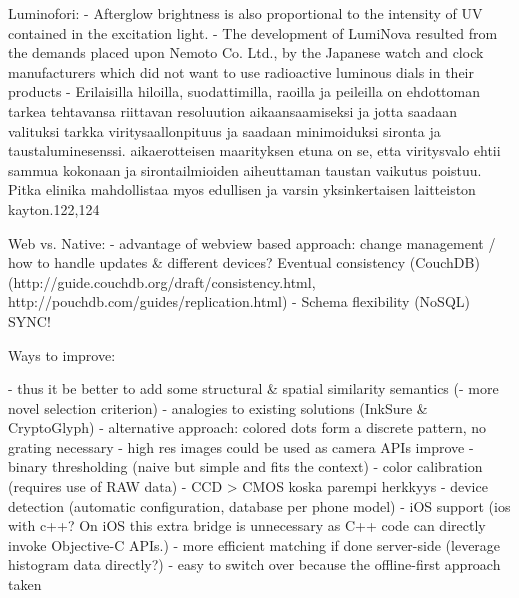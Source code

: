 \documentclass[thesis.tex]{subfiles}
\begin{document}
Luminofori:
- Afterglow brightness is also proportional to the intensity of UV contained in the excitation light.
- The development of LumiNova resulted from the demands placed upon Nemoto  Co. Ltd.,  by the Japanese watch and clock manufacturers which did not want to use radioactive luminous dials in their products
- Erilaisilla hiloilla, suodattimilla, raoilla ja peileilla on ehdottoman tarkea tehtavansa riittavan resoluution aikaansaamiseksi ja jotta saadaan valituksi tarkka viritysaallonpituus ja saadaan minimoiduksi sironta ja taustaluminesenssi. aikaerotteisen maarityksen etuna on se, etta viritysvalo ehtii sammua kokonaan ja sirontailmioiden aiheuttaman taustan vaikutus poistuu. Pitka elinika mahdollistaa myos edullisen ja varsin yksinkertaisen laitteiston kayton.122,124

Web vs. Native:
- advantage of webview based approach: change management / how to handle updates \& different devices?
Eventual consistency (CouchDB) (http://guide.couchdb.org/draft/consistency.html, http://pouchdb.com/guides/replication.html)
  - Schema flexibility (NoSQL) SYNC!

Ways to improve:

\begin{comment}
Color calibration

There are mainly two modules responsible for the color-rendering accuracy of a digital camera: the former is the illuminant estimation and correction module, and the latter is the color matrix transformation aimed to adapt the color response of the sensor to a standard color space. These two modules together form what may be called the color correction pipeline.

RGB is a device-dependent color model: different devices detect or reproduce a given RGB value differently, since the color elements (such as phosphors or dyes) and their response to the individual R, G, and B levels vary from manufacturer to manufacturer, or even in the same device over time. Thus an RGB value does not define the same color across devices without some kind of color management.

\url{http://www.cis.rit.edu/~jxj1770/publications/paperEI_Xerox.pdf}

\url{http://www.cs.unc.edu/techreports/04-012.pdf}
\end{comment}

- thus it be better to add some structural \& spatial similarity semantics (- more novel selection criterion) - analogies to existing solutions (InkSure \& CryptoGlyph)
  - alternative approach: colored dots form a discrete pattern, no grating necessary
- high res images could be used as camera APIs improve
- binary thresholding (naive but simple and fits the context)
- color calibration (requires use of RAW data)
  - CCD > CMOS koska parempi herkkyys
- device detection (automatic configuration, database per phone model)
- iOS support (ios with c++? On iOS this extra bridge is unnecessary as C++ code can directly invoke Objective-C APIs.)
- more efficient matching if done server-side (leverage histogram data directly?)
  - easy to switch over because the offline-first approach taken
\end{document}
